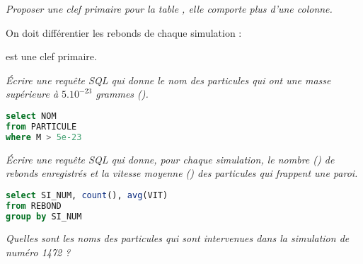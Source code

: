 \begin{Exercise}\it 
Proposer une clef primaire pour la table , elle comporte plus d'une colonne.
\end{Exercise}
\begin{Answer}
On doit différentier les rebonds de chaque simulation :

 est une clef primaire.
\end{Answer}
\begin{Exercise}\it 
Écrire une requête SQL qui donne le nom des particules qui ont une masse supérieure à $5.10^{-23}$ grammes ().
\end{Exercise}
\begin{Answer}
\begin{lstlisting}[language=SQL]
select NOM
from PARTICULE
where M > 5e-23
\end{lstlisting}
\end{Answer}
\begin{Exercise}\it 
Écrire une requête SQL qui donne, pour chaque simulation, le nombre  () de rebonds enregistrés et la vitesse moyenne () des particules qui frappent une paroi.
\end{Exercise}
\begin{Answer}
\begin{lstlisting}[language=SQL]
select SI_NUM, count(), avg(VIT)
from REBOND
group by SI_NUM
\end{lstlisting}
\end{Answer}
\begin{Exercise}\it 
Quelles sont les noms des particules qui sont intervenues dans la simulation de numéro 1472 ?
\end{Exercise}
